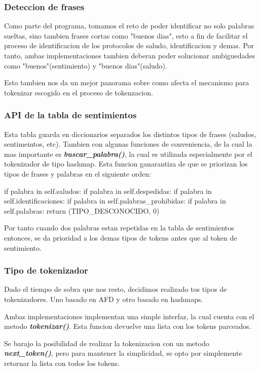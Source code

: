 \subsubsection{Deteccion de frases}

Como parte del programa, tomamos el reto de poder identificar no solo palabras sueltas, sino
tambien frases cortas como "buenos dias", esto a fin de facilitar el proceso de identificacion
de los protocolos de saludo, identificacion y demas. Por tanto, ambas implementaciones tambien
deberan poder solucionar ambiguedades como "buenos"(sentimiento) y "buenos dias"(saludo).

Esto tambien nos da un mejor panorama sobre como afecta el mecanismo para tokenizar escogido en
el proceso de tokenzacion.

\subsubsection{API de la tabla de sentimientos}

Esta tabla guarda en diccionarios separados los distintos tipos de frases (saludos,
sentimeintos, etc). Tambien con algunas funciones de conveniencia, de la cual la mas importante
es \textbf{\textit{buscar_palabra()}}, la cual es utilizada especialmente por el tokenizador de
tipo hashmap. Esta funcion ganarantiza de que se priorizan los tipos de frases y palabras en el
siguiente orden:

if palabra in self.saludos:
if palabra in self.despedidas:
if palabra in self.identificaciones:
if palabra in self.palabras_prohibidas:
if palabra in self.palabras:
return (TIPO_DESCONOCIDO, 0)

Por tanto cuando dos palabras estan repetidas en la tabla de sentimientos entonces, se da
prioridad a los demas tipos de tokens antes que al token de sentimiento.

\subsubsection{Tipo de tokenizador}
Dado el tiempo de sobra que nos resto, decidimos realizado tos tipos de tokenizadores. Uno
basado en AFD y otro basado en hashmaps.

Ambas implementaciones implementan una simple interfaz, la cual cuenta con el metodo
\textbf{\textit{tokenizar()}}. Esta funcion devuelve una lista con los tokens parceados.

Se barajo la posibilidad de realizar la tokenizacion con un metodo
\textbf{\textit{next_token()}}, pero para mantener la simplicidad, se opto por simplemente
retornar la lista con todos los tokens.

